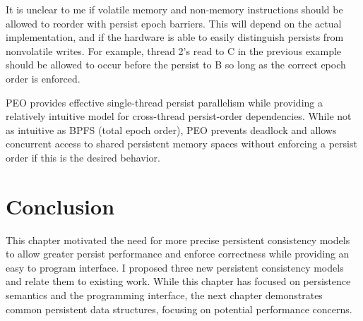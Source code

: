 It is unclear to me if volatile memory and non-memory instructions should be allowed to reorder with persist epoch barriers.
This will depend on the actual implementation, and if the hardware is able to easily distinguish persists from nonvolatile writes.
For example, thread 2's read to C in the previous example should be allowed to occur before the persist to B so long as the correct epoch order is enforced.

PEO provides effective single-thread persist parallelism while providing a relatively intuitive model for cross-thread persist-order dependencies.
While not as intuitive as BPFS (total epoch order), PEO prevents deadlock and allows concurrent access to shared persistent memory spaces without enforcing a persist order if this is the desired behavior.

\section{Conclusion}
\label{sec:PMC:Conclusion}

This chapter motivated the need for more precise persistent consistency models to allow greater persist performance and enforce correctness while providing an easy to program interface.
I proposed three new persistent consistency models and relate them to existing work.
While this chapter has focused on persistence semantics and the programming interface, the next chapter demonstrates common persistent data structures, focusing on potential performance concerns.
